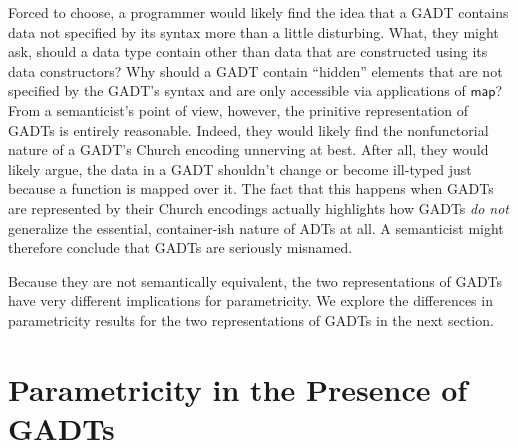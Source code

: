\documentclass[submission,copyright,creativecommons]{eptcs}
\begin{document}
Forced to choose, a programmer would likely find the idea that a GADT
contains data not specified by its syntax more than a little
disturbing. What, they might ask, should a data type contain other
than data that are constructed using its data constructors? Why should
a GADT contain ``hidden'' elements that are not specified by the
GADT's syntax and are only accessible via applications of
$\mathsf{map}$? From a semanticist's point of view, however, the
prinitive representation of GADTs is entirely reasonable. Indeed, they
would likely find the nonfunctorial nature of a GADT's Church encoding
unnerving at best. After all, they would likely argue, the data in a
GADT shouldn't change or become ill-typed just because a function is
mapped over it. The fact that this happens when GADTs are represented
by their Church encodings actually highlights how GADTs {\em do not}
generalize the essential, container-ish nature of ADTs at all. A
semanticist might therefore conclude that GADTs are seriously
misnamed.

\begin{comment}
The reader familiar with {\color{red} short cut fusion} will quickly
see that the non-uniform nature of GADTs that are not nested types
entails that short cut fusion cannot be validated for their Church
encodings. In fact, it is not even possible to define a
$\mathsf{build}$ function, which is a crucial ingredient in short cut
fusion, for the Church encoding of a GADT that is not a nested
type. But the fact that not all of the elements in the functorial
completion of a GADT that is not a nested type are directly
representable as applications of data constructors means that it is
also impossible to define a $\mathsf{build}$ function for the fixpoint
representation of such a GADT. Ultimately this is not surprising,
though: if short cut fusion were to hold for a GADT then its Church
encoding and {\color{red} fixpoint} primitive representation would
necessarily be semantically equivalent.
\end{comment}

Because they are not semantically equivalent, the two representations
of GADTs have very different implications for parametricity. We
explore the differences in parametricity results for the two
representations of GADTs in the next section.

\section{Parametricity in the Presence of GADTs}\label{sec:par}
\end{document}
